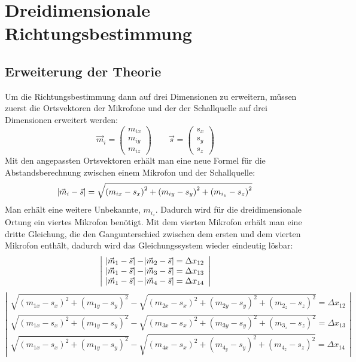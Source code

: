 \section{Dreidimensionale Richtungsbestimmung}
\subsection{Erweiterung der Theorie}
Um die Richtungsbestimmung dann auf drei Dimensionen zu erweitern, müssen zuerst die Ortsvektoren der Mikrofone und der der Schallquelle auf drei Dimensionen erweitert werden: $$\vec{m}_i = \begin{pmatrix}
m_{ix} \\
m_{iy} \\
m_{iz}
\end{pmatrix} \quad\quad
\vec{s} = \begin{pmatrix}
{s_x} \\
{s_y} \\
{s_z}
\end{pmatrix}$$
Mit den angepassten Ortsvektoren erhält man eine neue Formel für die Abstandsberechnung zwischen einem Mikrofon und der Schallquelle:
$$\abs{\vec{m}_i - \vec{s}} = \sqrt{{(m_{ix} - s_x)}^2 + {(m_{iy} - s_y)}^2 + {(m_{i_z} - s_z)}^2}$$
Man erhält eine weitere Unbekannte, $m_{i_z}$. Dadurch wird für die dreidimensionale Ortung ein viertes Mikrofon benötigt. Mit dem vierten Mikrofon erhält man eine dritte Gleichung, die den Gangunterschied zwischen dem ersten und dem vierten Mikrofon enthält, dadurch wird das Gleichungssystem wieder eindeutig lösbar:
$$\left|\begin{array}{c}
\abs{\vec{m}_1 - \vec{s}} - \abs{\vec{m}_2 - \vec{s}} = \Delta{x_{12}} \\
\abs{\vec{m}_1 - \vec{s}} - \abs{\vec{m}_3 - \vec{s}} = \Delta{x_{13}} \\
\abs{\vec{m}_1 - \vec{s}} - \abs{\vec{m}_4 - \vec{s}} = \Delta{x_{14}}
\end{array}\right|$$
$$\left|\begin{array}{c}
\sqrt{{(m_{1x} - s_x)}^2 + {(m_{1y} - s_y)}^2} - \sqrt{{(m_{2x} - s_x)}^2 + {(m_{2y} - s_y)}^2 + {(m_{2_z} - s_z)}^2} = \Delta{x_{12}} \\
\sqrt{{(m_{1x} - s_x)}^2 + {(m_{1y} - s_y)}^2} - \sqrt{{(m_{3x} - s_x)}^2 + {(m_{3y} - s_y)}^2 + {(m_{3_z} - s_z)}^2} = \Delta{x_{13}} \\
\sqrt{{(m_{1x} - s_x)}^2 + {(m_{1y} - s_y)}^2} - \sqrt{{(m_{4x} - s_x)}^2 + {(m_{4_y} - s_y)}^2 + {(m_{4_z} - s_z)}^2} = \Delta{x_{14}}
\end{array}\right|$$
